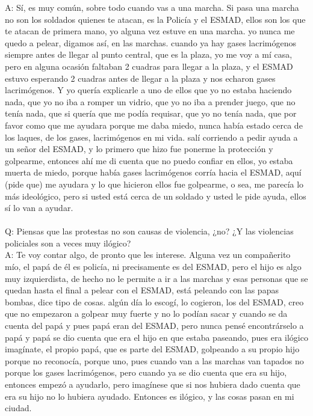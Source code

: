 \documentclass{phyasgn}\usepackage{nag}
\begin{document}
A: Sí, es muy común, sobre todo cuando vas a una marcha. Si pasa una marcha no son los soldados quienes te atacan, es la Policía y el ESMAD, ellos son los que te atacan de primera mano, yo alguna vez estuve en una marcha. yo nunca me quedo a pelear, digamos así, en las marchas. cuando ya hay gases lacrimógenos siempre antes de llegar al punto central, que es la plaza, yo me voy a mí casa, pero en alguna ocasión faltaban 2 cuadras para llegar a la plaza, y el ESMAD estuvo esperando 2 cuadras antes de llegar a la plaza y nos echaron gases lacrimógenos. Y yo quería explicarle a uno de ellos que yo no estaba haciendo nada, que yo no iba a romper un vidrio, que yo no iba a prender juego, que no tenía nada, que si quería que me podía requisar, que yo no tenía nada, que por favor como que me ayudara porque me daba miedo, nunca había estado cerca de los laques, de los gases, lacrimógenos en mi vida. salí corriendo a pedir ayuda a un señor del ESMAD, y lo primero que hizo fue ponerme la protección y golpearme, entonces ahí me di cuenta que no puedo confiar en ellos, yo estaba muerta de miedo, porque había gases lacrimógenos corría hacia el ESMAD, aquí (pide que) me ayudara y lo que hicieron ellos fue golpearme, o sea, me parecía lo más ideológico, pero si usted está cerca de un soldado y usted le pide ayuda, ellos sí lo van a ayudar.\\
\\
Q: Piensas que las protestas no son causas de violencia, ¿no? ¿Y las violencias policiales son a veces muy ilógico?\\
A: Te voy contar algo, de pronto que les interese. Alguna vez un compañerito mío, el papá de él es policía, ni precisamente es del ESMAD, pero el hijo es algo muy izquierdista, de hecho no le permite a ir a las marchas y esas personas que se quedan hasta el final a pelear con el ESMAD, está peleando con las papas bombas, dice tipo de cosas. algún día lo escogí, lo cogieron, los del ESMAD, creo que no empezaron a golpear muy fuerte y no lo podían sacar y cuando se da cuenta del papá y pues papá eran del ESMAD, pero nunca pensé encontrárselo a papá y papá se dio cuenta que era el hijo en que estaba paseando, pues era ilógico imagínate, el propio papá, que es parte del ESMAD, golpeando a su propio hijo porque no reconocía, porque uno, pues cuando van a las marchas van tapados no porque los gases lacrimógenos, pero cuando ya se dio cuenta que era su hijo, entonces empezó a ayudarlo, pero imagínese que si nos hubiera dado cuenta que era su hijo no lo hubiera ayudado. Entonces es ilógico, y las cosas pasan en mi ciudad.\\
\end{document}

